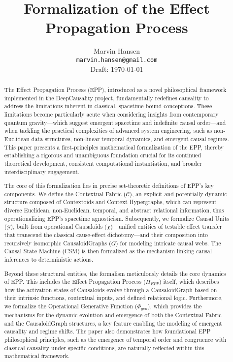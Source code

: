\documentclass{article}
\title{Formalization of the Effect Propagation Process}
\author{
  Marvin Hansen \\
  \texttt{marvin.hansen@gmail.com} \\
  Draft: \today
}
\begin{document}
\maketitle


\begin{abstract}
The Effect Propagation Process (EPP), introduced as a novel philosophical framework implemented in the DeepCausality project, fundamentally redefines causality to address the limitations inherent in classical, spacetime-bound conceptions. These limitations become particularly acute when considering insights from contemporary quantum gravity—which suggest emergent spacetime and indefinite causal order—and when tackling the practical complexities of advanced system engineering, such as non-Euclidean data structures, non-linear temporal dynamics, and emergent causal regimes. This paper presents a first-principles mathematical formalization of the EPP, thereby establishing a rigorous and unambiguous foundation crucial for its continued theoretical development, consistent computational instantiation, and broader interdisciplinary engagement.

The core of this formalization lies in precise set-theoretic definitions of EPP's key components. We define the {Contextual Fabric} (\(\mathcal{C}\)), an explicit and potentially dynamic structure composed of {Contextoids} and {Context Hypergraphs}, which can represent diverse Euclidean, non-Euclidean, temporal, and abstract relational information, thus operationalizing EPP's spacetime agnosticism. Subsequently, we formalize {Causal Units} (\(\mathcal{G}\)), built from operational {Causaloids} (\(\chi\))—unified entities of testable effect transfer that transcend the classical cause-effect dichotomy—and their composition into recursively isomorphic {CausaloidGraphs} (\(G\)) for modeling intricate causal webs. The Causal State Machine (CSM) is then formalized as the mechanism linking causal inferences to deterministic actions.

Beyond these structural entities, the formalism meticulously details the {core dynamics} of EPP. This includes the Effect Propagation Process (\(\Pi_{EPP}\)) itself, which describes how the activation states of {Causaloids} evolve through a {CausaloidGraph} based on their intrinsic functions, contextual inputs, and defined relational logic. Furthermore, we formalize the Operational Generative Function (\(\Phi_{gen}\)), which provides the mechanisms for the dynamic evolution and emergence of both the Contextual Fabric and the CausaloidGraph structures, a key feature enabling the modeling of emergent causality and regime shifts. The paper also demonstrates how foundational EPP philosophical principles, such as the emergence of temporal order and congruence with classical causality under specific conditions, are naturally reflected within this mathematical framework.


\end{abstract}
\end{document}
